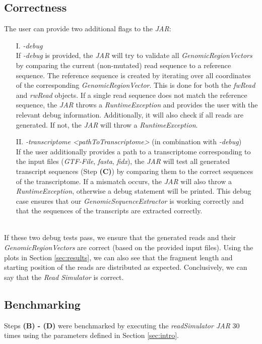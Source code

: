 \documentclass[12pt]{article}
\begin{document}
\subsection{Correctness}
The user can provide two additional flags to the \textit{JAR}:
\begin{enumerate}
	\item[I.] \textit{-debug}\\
		If \textit{-debug} is provided, the \textit{JAR} will try to validate all \textit{GenomicRegionVectors} by comparing the current (non-mutated) read sequence
		to a reference sequence. The reference sequence is created by iterating over all coordinates of the corresponding \textit{GenomicRegionVector}.
		This is done for both the \textit{fwRead} and \textit{rwRead} objects. If a single read sequence does not match the reference sequence,
		the \textit{JAR} throws a \textit{RuntimeException} and provides the user with the relevant debug information.
        Additionally, it will also check if all reads are generated. If not, the \textit{JAR} will throw a \textit{RuntimeException}.

	\item[II.] \textit{-transcriptome <pathToTranscriptome>} (in combination with \textit{-debug})\\
		If the user additionally provides a path to a transcriptome corresponding to the input files (\textit{GTF-File}, \textit{fasta}, \textit{fidx}), the \textit{JAR} will
		test all generated transcript sequences (Step \textbf{(C)}) by comparing them to the correct sequences of the transcriptome. If a mismatch
		occurs, the \textit{JAR} will also throw a \textit{RuntimeException}, otherwise a debug statement will be printed.
        This debug case ensures that our \textit{GenomicSequenceExtractor} is working correctly and that the sequences of the transcripts are extracted correctly.
\end{enumerate}
\hspace{0.1mm} \\
If these two debug tests pass, we ensure that the generated reads and their \textit{GenomicRegionVectors} are correct (based on the provided input files).
Using the plots in Section \ref{sec:results}, we can also see that the fragment length and starting position of the reads are distributed as expected.
Conclusively, we can say that the \textit{Read Simulator} is correct.


\newpage

\subsection{Benchmarking}
Steps \textbf{(B) - (D)} were benchmarked by executing the \textit{readSimulator JAR} 30 times using the parameters defined in Section \ref{sec:intro}.
\end{document}
